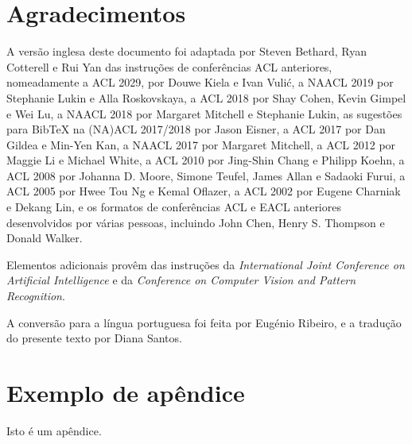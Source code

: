 \documentclass[11pt]{article}
\begin{document}
\section{Agradecimentos}
A versão inglesa deste documento foi adaptada por Steven Bethard, Ryan Cotterell e Rui Yan das instruções de conferências ACL anteriores, nomeadamente a ACL 2029, por Douwe Kiela e Ivan Vuli\'{c}, a NAACL 2019 por Stephanie Lukin e Alla Roskovskaya, a ACL 2018 por Shay Cohen, Kevin Gimpel e Wei Lu, a NAACL 2018 por Margaret Mitchell e Stephanie Lukin, as sugestões para 
Bib\TeX{} na (NA)ACL 2017/2018 por Jason Eisner, a
ACL 2017 por Dan Gildea e Min-Yen Kan,
a NAACL 2017 por Margaret Mitchell,
a ACL 2012 por Maggie Li e Michael White,
a ACL 2010 por Jing-Shin Chang e Philipp Koehn,
a ACL 2008 por Johanna D. Moore, Simone Teufel, James Allan e Sadaoki Furui, a ACL 2005 por Hwee Tou Ng e Kemal Oflazer, a ACL 2002 por Eugene Charniak e Dekang Lin, e os formatos de conferências ACL e EACL anteriores desenvolvidos por várias pessoas, incluindo John Chen, Henry S. Thompson e Donald Walker.


Elementos adicionais provêm das instruções da \emph{International Joint Conference on Artificial Intelligence} e da \emph{Conference on Computer Vision and Pattern Recognition}.

A conversão para a língua portuguesa foi feita por Eugénio Ribeiro, e a tradução do presente texto por Diana Santos.
%
% 



\appendix

\section{Exemplo de apêndice}
\label{sec:apendice}

Isto é um apêndice.
\end{document}
